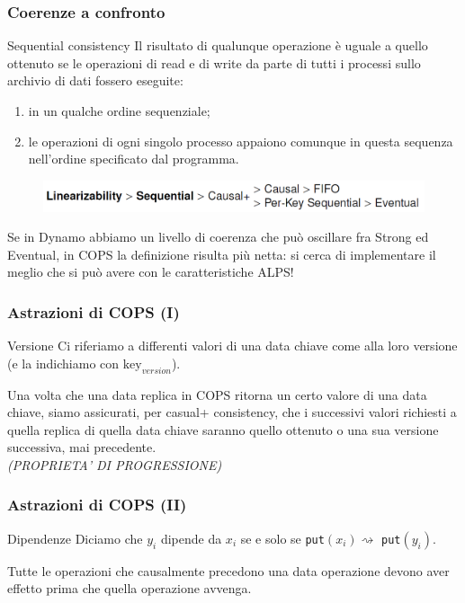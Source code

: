 \begin{frame}
\frametitle{Coerenze a confronto}
\begin{block}{Sequential consistency}
Il risultato di qualunque operazione è uguale a quello ottenuto se le operazioni
di read e di write da parte di tutti i processi sullo archivio di dati fossero eseguite:
	\begin{enumerate}
		\item in un qualche ordine sequenziale;
		\item le operazioni di ogni singolo processo appaiono comunque in questa sequenza
			  nell'ordine specificato dal programma.
	\end{enumerate}
\end{block}	
	\begin{figure}
		\centering
		\includegraphics[scale=0.35]{COPS/COPS6.png}
	\end{figure}

Se in Dynamo abbiamo un livello di coerenza che può oscillare fra Strong ed Eventual,
in COPS la definizione risulta più netta: si cerca di implementare il meglio che si può
avere con le caratteristiche ALPS!
\end{frame}

\begin{frame}
\frametitle{Astrazioni di COPS (I)}
\begin{block}{Versione}
Ci riferiamo a differenti valori di una data chiave come alla loro \alert{versione}
(e la indichiamo con $\text{key}_{version}$).
\end{block}
Una volta che una data replica in COPS ritorna un certo valore di una data chiave,
siamo assicurati, per casual+ consistency, che i successivi valori richiesti a quella
replica di quella data chiave saranno quello ottenuto o una sua versione successiva,
mai precedente.\\
\textit{(PROPRIETA' DI PROGRESSIONE)}
\end{frame}

\begin{frame}
\frametitle{Astrazioni di COPS (II)}
\begin{block}{Dipendenze}
Diciamo che $y_i$ \alert{dipende da} $x_i$ se e solo se \texttt{put}$(x_i)
\rightsquigarrow$ \texttt{put}$(y_i)$.
\end{block}
Tutte le operazioni che causalmente precedono una data operazione devono aver effetto
prima che quella operazione avvenga.
\end{frame}


